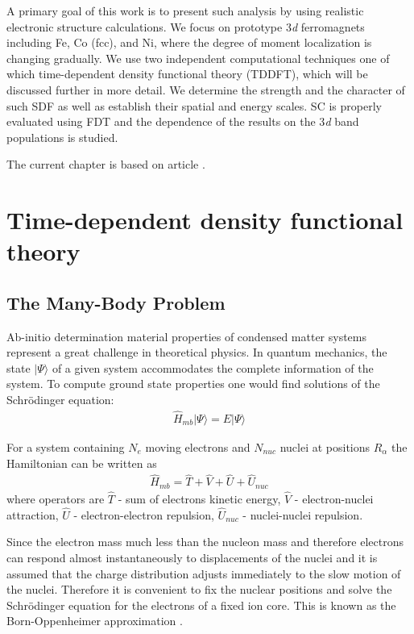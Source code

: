 A primary goal of this work is to present such analysis by using realistic electronic structure calculations. We focus on prototype 3\emph{d} ferromagnets including Fe, Co (fcc), and Ni, where the degree of moment localization is changing gradually. We use two independent computational techniques one of which time-dependent density functional theory (TDDFT), which will be discussed further in more detail. We determine the strength and the character of such SDF as well as establish their spatial and energy scales. SC is properly evaluated using FDT and the dependence of the results on the 3\emph{d} band populations is studied. 

The current chapter is based on article \citep{PhysRevB.96.184418}.


\section{Time-dependent density functional theory}

\subsection{The Many-Body Problem}

Ab-initio determination material properties of condensed matter systems represent a great challenge in theoretical physics. In quantum mechanics, the state $|\Psi\rangle$ of a given system accommodates the complete information of the system. 
To compute ground state properties one would find solutions of the Schrödinger equation:
\begin{align}
\hat{H}_{mb} \vert \Psi \rangle=E \vert \Psi \rangle
\label{TDDFT_TD_SE}
\end{align}

For a system containing $N_e$ moving electrons and $N_{nuc}$ nuclei at positions $R_{\alpha}$ the Hamiltonian can be written as
\begin{align}
\hat{H}_{mb}=\hat{T}+\hat{V}+\hat{U}+\hat{U}_{nuc}
\label{mb_Hamiltonian_general}
\end{align}
where operators are $\hat{T}$ - sum of electrons kinetic energy, $\hat{V}$ - electron-nuclei attraction, $\hat{U}$ - electron-electron repulsion, $\hat{U}_{nuc}$ - nuclei-nuclei repulsion.

Since the electron mass much less than the nucleon mass and therefore electrons can respond almost instantaneously to displacements of the nuclei and it is assumed that the charge distribution adjusts immediately to the slow motion of the nuclei. Therefore it is convenient to fix the nuclear positions and solve the Schrödinger equation for the electrons of a fixed ion core. This is known as the Born-Oppenheimer approximation \citep{doi:10.1002/andp.19273892002}.

